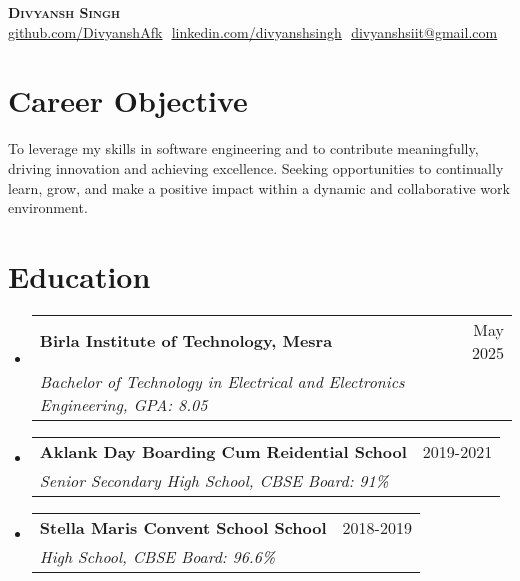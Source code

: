 \documentclass[letterpaper,11pt]{article}
\makeatletter
\newcommand{\resumeSubheading}[4]{
  \vspace{-2pt}\item
    \begin{tabular*}{0.97\textwidth}[t]{l@{\extracolsep{\fill}}r}
      \textbf{#1} & #2 \\
      \textit{\small#3} & \textit{\small #4} \\
    \end{tabular*}\vspace{-7pt}
}
\newcommand{\resumeSubHeadingListStart}{\begin{itemize}[leftmargin=0.15in, label={}]}
\newcommand{\resumeSubHeadingListEnd}{\end{itemize}}
\makeatother
\begin{document}


\vspace{-5pt}

\begin{center}
    \textbf{\Huge \scshape Divyansh Singh} \\ \vspace{8pt}
    \small 
    \href{https://github.com/DivyanshAfk}{\underline{github.com/DivyanshAfk}} $  $
    \href{https://www.linkedin.com/in/divyansh-singh-739960232}{\underline{linkedin.com/divyanshsingh}} $  $
    \href{mailto:divyanshsiit@gmail.com}
    {\underline{divyanshsiit@gmail.com}}
\end{center}

\section{Career Objective}
\resumeSubHeadingListStart
{To leverage my skills in software engineering and to contribute meaningfully, driving innovation and achieving excellence. Seeking opportunities to continually learn, grow, and make a positive impact within a dynamic and collaborative work environment.}
\resumeSubHeadingListEnd


\section{Education}
  \resumeSubHeadingListStart
  
    \resumeSubheading
      {Birla Institute of Technology, Mesra}{May 2025}
      {Bachelor of Technology in Electrical and Electronics Engineering, GPA: 8.05}{}
      
    \resumeSubheading
      {Aklank Day Boarding Cum Reidential School}{2019-2021}
      {Senior Secondary High School, CBSE Board: 91\%}{}

      \resumeSubheading
      {Stella Maris Convent School School}{2018-2019}
      {High School, CBSE Board: 96.6\%}{}

    

  \resumeSubHeadingListEnd
  
  

\end{document}
